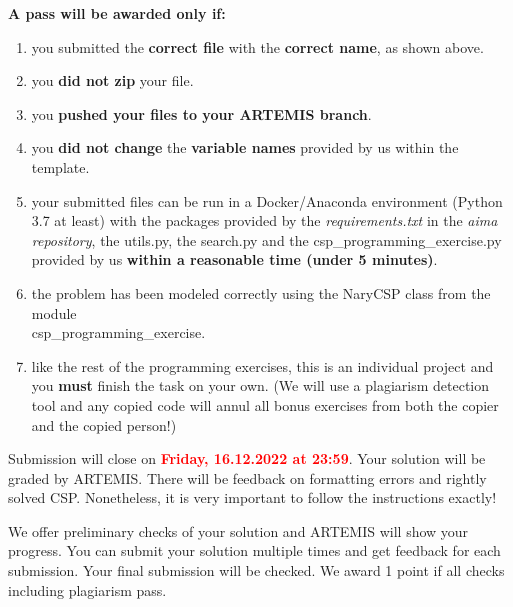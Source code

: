 \documentclass[a4paper,10pt]{article}
\begin{document}
%
%

\textbf{A pass will be awarded only if:}
\vspace{-0.3cm}
\begin{enumerate}
	\item you submitted the \textbf{correct file} with the \textbf{correct name}, as shown above.
	\item you \textbf{did not zip} your file.
	\item you \textbf{pushed your files to your ARTEMIS branch}.
	\item you \textbf{did not change} the \textbf{variable names} provided by us within the template.
	\item your submitted files can be run in a Docker/Anaconda environment (Python 3.7 at least) with the packages provided by the \textit{requirements.txt} in the \textit{aima repository}, the utils.py, the search.py and the csp\_programming\_exercise.py provided by us \textbf{within a reasonable time (under 5 minutes)}.
	\item the problem has been modeled correctly using the NaryCSP class from the module \\ csp\_programming\_exercise.
	\item like the rest of the programming exercises, this is an individual project and you \textbf{must} finish the task on your
	      own. (We will use a plagiarism detection tool and any copied code will annul all bonus exercises
	      from both the copier and the copied person!)
\end{enumerate}


Submission will close on \textcolor{red}{\textbf{Friday, 16.12.2022 at 23:59}}. Your solution will be graded by ARTEMIS. There will be feedback on formatting errors and rightly solved CSP. Nonetheless, it is very important to follow the instructions exactly!

We offer preliminary checks of your solution and ARTEMIS will show your progress. You can submit your solution multiple times and get feedback for each submission. Your final submission will be checked. We award 1 point if all checks including plagiarism pass.
\end{document}
